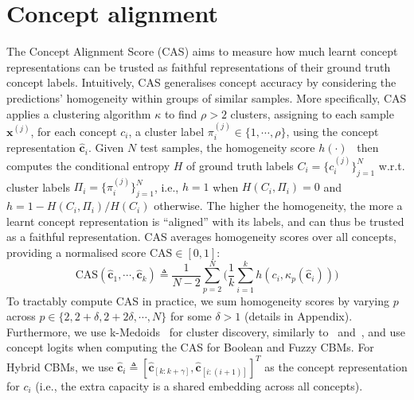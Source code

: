 \section{Concept alignment}
The Concept Alignment Score (CAS) aims to measure how much learnt concept representations can be trusted as faithful representations of their ground truth concept labels. Intuitively, CAS generalises concept accuracy by considering the predictions' homogeneity within groups of similar samples. More specifically, CAS applies a clustering algorithm $\kappa$ to find $\rho > 2$ clusters, assigning to each sample $\mathbf{x}^{(j)}$, for each concept $c_i$, a cluster label $\pi_i^{(j)} \in \{1, \cdots, \rho\}$, using the concept representation $\hat{\textbf{c}}_i$. Given $N$ test samples, the homogeneity score $h(\cdot)$~\citep{rosenberg2007v} then computes the conditional entropy $H$ of ground truth labels $C_i = \{c_i^{(j)}\}_{j=1}^{N}$ w.r.t. cluster labels $\Pi_i = \{\pi_i^{(j)}\}_{j=1}^{N}$, i.e., $h = 1$ when $H(C_i,\Pi_i)=0$ and $h = 1 - H(C_i, \Pi_i)/H(C_i)$ otherwise. The higher the homogeneity, the more a learnt concept representation is ``aligned'' with its labels, and can thus be trusted as a faithful representation. CAS averages homogeneity scores over all concepts, providing a normalised score $\text{CAS} \in [0,1]$:
\begin{equation}
    \text{CAS}(\mathbf{\hat{c}}_1, \cdots, \mathbf{\hat{c}}_k) \triangleq \frac{1}{N - 2}\sum_{p=2}^N \Bigg(\frac{1}{k} \sum_{i=1}^k h(c_i, \kappa_p(\hat{\textbf{c}}_i)) \Bigg)
\end{equation}
To tractably compute CAS in practice, we sum homogeneity scores by varying $p$ across $p \in \{2, 2 + \delta, 2 + 2 \delta, \cdots, N\}$ for some $\delta > 1$ (details in Appendix). Furthermore, we use k-Medoids~\citep{kaufman1990partitioning} for cluster discovery, similarly to~\citet{ghorbani2019interpretation} and~\citet{magister2021gcexplainer}, and use concept logits when computing the CAS for Boolean and Fuzzy CBMs. For Hybrid CBMs, we use $\hat{\mathbf{c}}_i \triangleq [\hat{\mathbf{c}}_{[k:k + \gamma]}, \hat{\mathbf{c}}_{[i:(i + 1)]}]^T$ as the concept representation for $c_i$ (i.e., the extra capacity is a shared embedding across all concepts).

